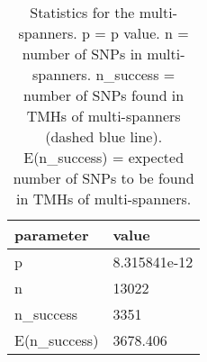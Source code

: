 \begin{table}

\caption{\label{tab:snp_stats_per_spanner_multi}Statistics for the multi-spanners. p = p value. n = number of SNPs in multi-spanners. n\_success = number of SNPs found in TMHs of multi-spanners (dashed blue line). E(n\_success) = expected number of SNPs to be found in TMHs of multi-spanners. }
\centering
\begin{tabular}[t]{l|l}
\hline
parameter & value\\
\hline
p & 8.315841e-12\\
\hline
n & 13022\\
\hline
n\_success & 3351\\
\hline
E(n\_success) & 3678.406\\
\hline
\end{tabular}
\end{table}
